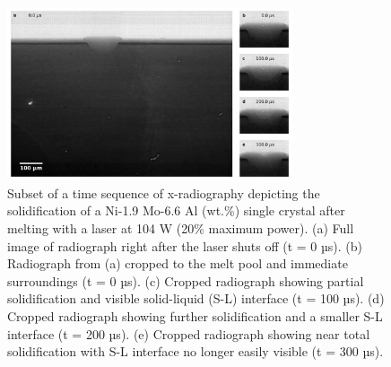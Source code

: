 \begin{figure}[ht!]
    \centering
    \includegraphics[width=0.75\textwidth]{figures/04/01-rad-seq.png}
    \caption{
        \small{}
        Subset of a time sequence of x-radiography depicting the solidification
        of a Ni-1.9 Mo-6.6 Al (wt.\%) single crystal after melting with a
        laser at 104 W (20\% maximum power).
        (a) Full image of radiograph right after the laser shuts off
        (t = 0 µs).
        (b) Radiograph from (a) cropped to the melt pool and immediate
        surroundings (t = 0 µs).
        (c) Cropped radiograph showing partial solidification and visible
        solid-liquid (S-L) interface (t = 100 µs).
        (d) Cropped radiograph showing further solidification and a smaller
        S-L interface (t = 200 µs).
        (e) Cropped radiograph showing near total solidification with S-L
        interface no longer easily visible (t = 300 µs).
    }
    \label{fig/rad-seq}
\end{figure}

